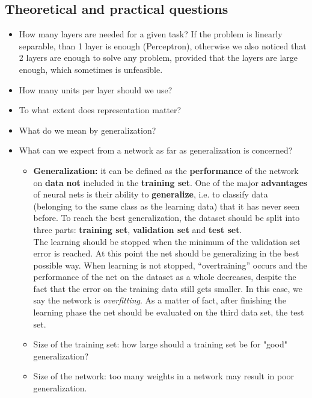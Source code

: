 \subsection{Theoretical and practical questions}
\begin{itemize}
	\item How many layers are needed for a given task? If the problem is linearly separable, than 1 layer is enough (Perceptron), otherwise we also noticed that 2 layers are enough to solve any problem, provided that the layers are large enough, which sometimes is unfeasible.
	\item How many units per layer should we use?
	\item To what extent does representation matter?
	\item What do we mean by generalization?
	\item What can we expect from a network as far as generalization is concerned?
	\begin{itemize}
		\item \textbf{Generalization:} it can be defined as the \textbf{performance} of the network on \textbf{data} \textbf{not} included in the \textbf{training set}. One of the major \textbf{advantages} of neural nets is their ability to \textbf{generalize}, i.e. to classify data (belonging to the same class as the learning data) that it has never seen before. To reach the best generalization, the dataset should be split into three parts: \textbf{training set}, \textbf{validation set} and \textbf{test set}.\\
		The learning should be stopped when the minimum of the validation set error is reached. At this point the net should be generalizing in the best possible way. When learning is not stopped, ``overtraining'' occurs and the performance of the net on the dataset as a whole decreases, despite the fact that the error on the training data still gets smaller. In this case, we say the network is \textit{overfitting}. As a matter of fact, after finishing the learning phase the net should be evaluated on the third data set, the test set.
		\item Size of the training set: how large should a training set be for "good" generalization?
		\item Size of the network: too many weights in a network may result in poor generalization.
	\end{itemize}
\end{itemize}

